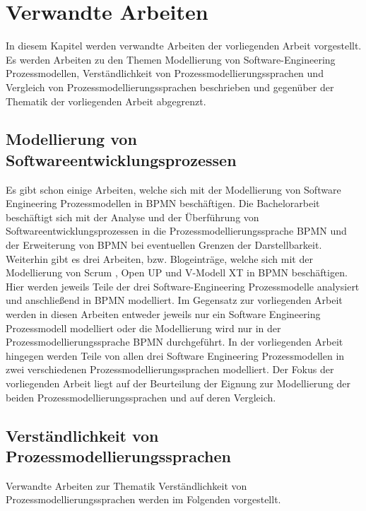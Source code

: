 \chapter{Verwandte Arbeiten}\label{sec:chapter9}

In diesem Kapitel werden verwandte Arbeiten der vorliegenden Arbeit vorgestellt. Es werden Arbeiten zu den Themen Modellierung von Software-Engineering Prozessmodellen, Verständlichkeit von Prozessmodellierungssprachen und Vergleich von Prozessmodellierungssprachen beschrieben und gegenüber der Thematik der vorliegenden Arbeit abgegrenzt.

\section{Modellierung von Softwareentwicklungsprozessen}

Es gibt schon einige Arbeiten, welche sich mit der Modellierung von Software Engineering Prozessmodellen in BPMN beschäftigen.
Die Bachelorarbeit \cite{Menhorn2014} beschäftigt sich mit der Analyse und der Überführung von Softwareentwicklungsprozessen in die Prozessmodellierungssprache BPMN und der Erweiterung von BPMN bei eventuellen Grenzen der Darstellbarkeit.\newline
Weiterhin gibt es drei Arbeiten, bzw. Blogeinträge, welche sich mit der Modellierung von Scrum \cite{software}, Open UP \cite{brunner2007fallstudie} und \cite{Bregenzer2014} V-Modell XT in BPMN beschäftigen. Hier werden jeweils Teile der drei Software-Engineering Prozessmodelle analysiert und anschließend in BPMN modelliert.\newline
Im Gegensatz zur vorliegenden Arbeit werden in diesen Arbeiten entweder jeweils nur ein Software Engineering Prozessmodell modelliert oder die Modellierung wird nur in der Prozessmodellierungssprache BPMN durchgeführt. In der vorliegenden Arbeit hingegen werden Teile von allen drei Software Engineering Prozessmodellen in zwei verschiedenen Prozessmodellierungssprachen modelliert. Der Fokus der vorliegenden Arbeit liegt auf der Beurteilung der Eignung zur Modellierung der beiden Prozessmodellierungssprachen und auf deren Vergleich.\newline


\section{Verständlichkeit von Prozessmodellierungssprachen}

Verwandte Arbeiten zur Thematik Verständlichkeit von Prozessmodellierungssprachen werden im Folgenden vorgestellt.

